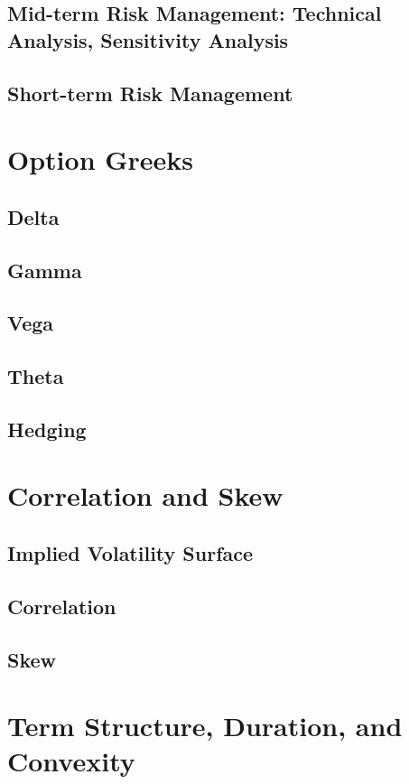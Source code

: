 \documentclass{book}
\begin{document}
\subsection{Mid-term Risk Management: Technical Analysis, Sensitivity Analysis}
\subsection{Short-term Risk Management}

\section{Option Greeks}
\subsection{Delta}
\subsection{Gamma}
\subsection{Vega}
\subsection{Theta}
\subsection{Hedging}

\section{Correlation and Skew}
\subsection{Implied Volatility Surface}
\subsection{Correlation}
\subsection{Skew}

\section{Term Structure, Duration, and Convexity}
\end{document}
